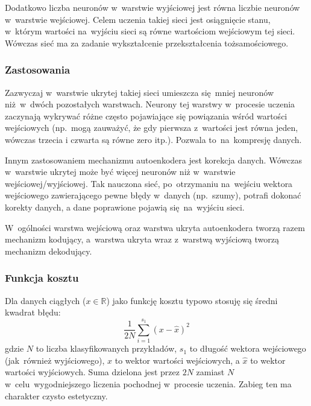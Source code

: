 Dodatkowo liczba neuronów w~warstwie wyjściowej jest równa liczbie neuronów w~warstwie wejściowej.
Celem uczenia takiej sieci jest osiągnięcie stanu, w~którym wartości na~wyjściu sieci są równe
wartościom wejściowym tej sieci. Wówczas sieć ma za zadanie wykształcenie przekształcenia tożsamościowego.

\subsubsection{Zastosowania}
Zazwyczaj w~warstwie ukrytej takiej sieci umieszcza się~mniej neuronów niż~w~dwóch pozostałych warstwach.
Neurony tej warstwy w~procesie uczenia zaczynają wykrywać różne często pojawiające się powiązania
wśród wartości wejściowych (np.~mogą zauważyć, że gdy pierwsza z~wartości jest równa jeden,
wówczas trzecia i czwarta są równe zero itp.).
Pozwala to~na~kompresję danych.

Innym zastosowaniem mechanizmu autoenkodera jest korekcja danych. Wówczas w~warstwie ukrytej
może być więcej neuronów niż w~warstwie wejściowej/wyjściowej. Tak nauczona sieć, po~otrzymaniu na~wejściu
wektora wejściowego zawierającego pewne błędy w~danych (np.~szumy), potrafi dokonać korekty danych,
a dane poprawione pojawią się~na~wyjściu sieci.

W~ogólności warstwa wejściową oraz warstwa ukryta autoenkodera tworzą razem mechanizm kodujący, a~warstwa ukryta wraz
z~warstwą wyjściową tworzą mechanizm dekodujący.

\subsubsection{Funkcja kosztu}
Dla danych ciągłych ($x\in\mathbb{R}$) jako funkcję kosztu typowo stosuję się średni kwadrat błędu:
\begin{equation*}
\frac{1}{2N}\sum\limits_{i=1}^{s_1}(x-\hat{x})^2
\end{equation*}
gdzie $N$ to liczba klasyfikowanych przykładów, $s_1$ to długość wektora wejściowego (jak~również wyjściowego),
$x$ to wektor wartości wejściowych, a $\hat{x}$ to wektor wartości wyjściowych. Suma dzielona jest przez $2N$ zamiast
$N$ w~celu~wygodniejszego liczenia pochodnej w~procesie uczenia. Zabieg ten ma charakter czysto estetyczny.

